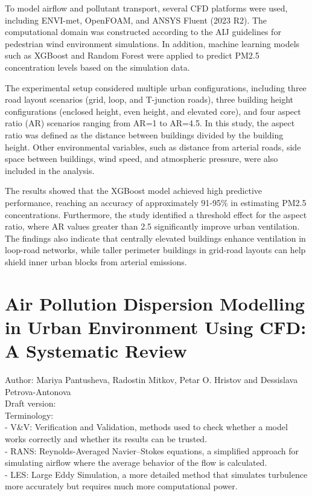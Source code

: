 \documentclass[12pt,a4paper]{article}
\begin{document}
To model airflow and pollutant transport, several CFD platforms were used,
including ENVI-met, OpenFOAM, and ANSYS Fluent (2023 R2). The computational
domain was constructed according to the AIJ guidelines for pedestrian wind
environment simulations. In addition, machine learning models such as
XGBoost and Random Forest were applied to predict PM2.5 concentration levels
based on the simulation data.

The experimental setup considered multiple urban configurations, including
three road layout scenarios (grid, loop, and T-junction roads),
three building height configurations (enclosed height, even height, and
elevated core), and four aspect ratio (AR) scenarios ranging from AR=1 to
AR=4.5. In this study, the aspect ratio was defined as the distance between
buildings divided by the building height. Other environmental variables,
such as distance from arterial roads, side space between buildings, wind
speed, and atmospheric pressure, were also included in the analysis.

The results showed that the XGBoost model achieved high predictive
performance, reaching an accuracy of approximately 91-95\% in estimating
PM2.5 concentrations. Furthermore, the study identified a threshold effect
for the aspect ratio, where AR values greater than 2.5 significantly improve
urban ventilation. The findings also indicate that centrally elevated
buildings enhance ventilation in loop-road networks, while taller perimeter
buildings in grid-road layouts can help shield inner urban blocks from
arterial emissions.

\section{Air Pollution Dispersion Modelling in Urban Environment
Using CFD: A Systematic Review}

Author: Mariya Pantusheva, Radostin Mitkov, Petar O. Hristov and Dessislava Petrova-Antonova \\

Draft version:\\

Terminology: \\
- V\&V: Verification and Validation, methods used to check whether a model works correctly and whether its results can be trusted. \\
- RANS: Reynolds-Averaged Navier--Stokes equations, a simplified approach for simulating airflow where the average behavior of the flow is calculated. \\
- LES: Large Eddy Simulation, a more detailed method that simulates turbulence more accurately but requires much more computational power. \\
\\
\end{document}
